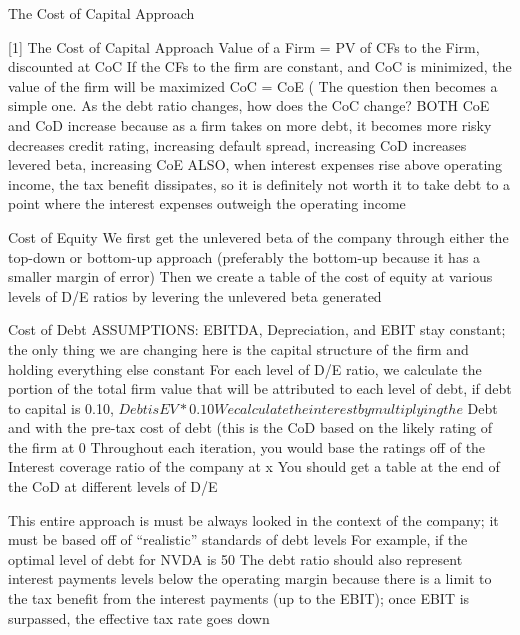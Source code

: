 \documentclass[10pt]{article}
\begin{document}
    \begin{core}{The Cost of Capital Approach}

      [1] The Cost of Capital Approach
      Value of a Firm = PV of CFs to the Firm, discounted at CoC
      If the CFs to the firm are constant, and CoC is minimized, the value of the firm will be maximized
      CoC = CoE (%
      The question then becomes a simple one. As the debt ratio changes, how does the CoC change?
      BOTH CoE and CoD increase because as a firm takes on more debt, it becomes more risky
      decreases credit rating, increasing default spread, increasing CoD
      increases levered beta, increasing CoE
      ALSO, when interest expenses rise above operating income, the tax benefit dissipates, so it is definitely not worth it to take debt to a point where the interest expenses outweigh the operating income

      Cost of Equity
      We first get the unlevered beta of the company through either the top-down or bottom-up approach (preferably the bottom-up because it has a smaller margin of error)
      Then we create a table of the cost of equity at various levels of D/E ratios by levering the unlevered beta generated

      Cost of Debt
      ASSUMPTIONS: EBITDA, Depreciation, and EBIT stay constant; the only thing we are changing here is the capital structure of the firm and holding everything else constant
      For each level of D/E ratio, we calculate the portion of the total firm value that will be attributed to each level of debt, if debt to capital is 0.10, $ Debt is EV*0.10
      We calculate the interest by multiplying the $ Debt and with the pre-tax cost of debt (this is the CoD based on the likely rating of the firm at 0%
      Throughout each iteration, you would base the ratings off of the Interest coverage ratio of the company at x%
      You should get a table at the end of the CoD at different levels of D/E

      This entire approach is must be always looked in the context of the company; it must be based off of “realistic” standards of debt levels
      For example, if the optimal level of debt for NVDA is 50%
      The debt ratio should also represent interest payments levels below the operating margin because there is a limit to the tax benefit from the interest payments (up to the EBIT); once EBIT is surpassed, the effective tax rate goes down


\end{core}
\end{document}

